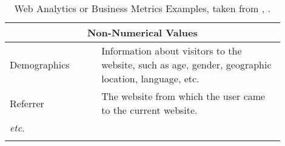 \begin{center}
\begin{longtable}{ | p{0.3\linewidth} | p{0.6\linewidth} | }
	\hline
	\multicolumn{2}{|c|}{ \cellcolor{lightgrey} Non-Numerical Values} \\
	\hline
	Demographics & Information about visitors to the website, such as age, gender, geographic location, language, etc. \\	
	\hline
	Referrer & The website from which the user came to the current website. \\	
	\hline
	\textit{etc.} &  \\
	\hline
	
	\caption[Web Analytics or Business Metrics Examples]{Web Analytics or Business Metrics Examples, taken from \cite{2004Peterson}, \cite{2007Burby}.} %
	\label{table:businessmetrics}
	\end{longtable}
\end{center}












